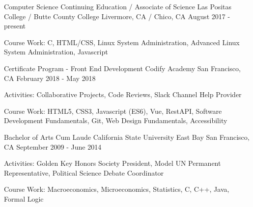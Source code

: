 

\begin{cventries}

 \cventry
    {Computer Science Continuing Education / Associate of Science} 
    {Las Positas College / Butte County College} %
    {Livermore, CA / Chico, CA} %
    {August 2017 - present} %
    {
      \begin{cvitems} %
      \item {Course Work: C, HTML/CSS, Linux System Administration, Advanced Linux System Administration, Javascript}
      \end{cvitems}
    }
  \cventry
    {Certificate Program - Front End Development} %
    {Codify Academy} %
    {San Francisco, CA} %
    {February 2018 - May 2018} %
    {
      \begin{cvitems} %
      \item {Activities: Collaborative Projects, Code Reviews, Slack Channel Help Provider}
      \item {Course Work: HTML5, CSS3, Javascript (ES6), Vue, RestAPI, Software Development Fundamentals, Git, Web Design Fundamentals, Accessibility}
      \end{cvitems}
    }
      
      
\cventry
    {Bachelor of Arts Cum Laude} %
    {California State University East Bay} %
    {San Francisco, CA} %
    {September 2009 - June 2014} %
    {
      \begin{cvitems} %
      \item {Activities: Golden Key Honors Society President, Model UN Permanent Representative, Political Science Debate Coordinator}
      \item {Course Work: Macroeconomics, Microeconomics, Statistics, C, C++, Java, Formal Logic }
      \end{cvitems}
    }
    
    

\end{cventries}
